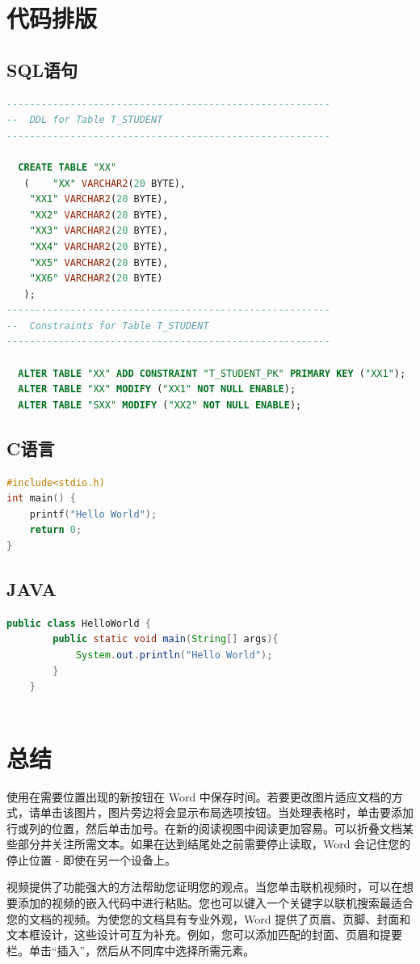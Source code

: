 \documentclass[fontset=windows]{ctexart}
\numberwithin{figure}{section}		%
\begin{document}
\section{代码排版}
\subsection{SQL语句}

\begin{lstlisting}[language=SQL,escapeinside=``]
--------------------------------------------------------
--  DDL for Table T_STUDENT
--------------------------------------------------------

  CREATE TABLE "XX" 
   (	"XX" VARCHAR2(20 BYTE), 
	"XX1" VARCHAR2(20 BYTE), 
	"XX2" VARCHAR2(20 BYTE), 
	"XX3" VARCHAR2(20 BYTE), 
	"XX4" VARCHAR2(20 BYTE), 
	"XX5" VARCHAR2(20 BYTE), 
	"XX6" VARCHAR2(20 BYTE)
   );
--------------------------------------------------------
--  Constraints for Table T_STUDENT
--------------------------------------------------------

  ALTER TABLE "XX" ADD CONSTRAINT "T_STUDENT_PK" PRIMARY KEY ("XX1");
  ALTER TABLE "XX" MODIFY ("XX1" NOT NULL ENABLE);
  ALTER TABLE "SXX" MODIFY ("XX2" NOT NULL ENABLE);

\end{lstlisting}


\subsection{C语言}
\begin{lstlisting}[language=C,escapeinside=``]
#include<stdio.h)
int main() {
	printf("Hello World");
	return 0;
}
\end{lstlisting}
\subsection{JAVA}
\begin{lstlisting}[language=JAVA,escapeinside=``]
	public class HelloWorld {
		public static void main(String[] args){
			System.out.println("Hello World");
		}
	}
	
\end{lstlisting}



\newpage
\section{总结}
使用在需要位置出现的新按钮在 Word 中保存时间。若要更改图片适应文档的方式，请单击该图片，图片旁边将会显示布局选项按钮。当处理表格时，单击要添加行或列的位置，然后单击加号。在新的阅读视图中阅读更加容易。可以折叠文档某些部分并关注所需文本。如果在达到结尾处之前需要停止读取，Word 会记住您的停止位置 - 即使在另一个设备上。
\par 视频提供了功能强大的方法帮助您证明您的观点。当您单击联机视频时，可以在想要添加的视频的嵌入代码中进行粘贴。您也可以键入一个关键字以联机搜索最适合您的文档的视频。为使您的文档具有专业外观，Word 提供了页眉、页脚、封面和文本框设计，这些设计可互为补充。例如，您可以添加匹配的封面、页眉和提要栏。单击“插入”，然后从不同库中选择所需元素。
\end{document}
